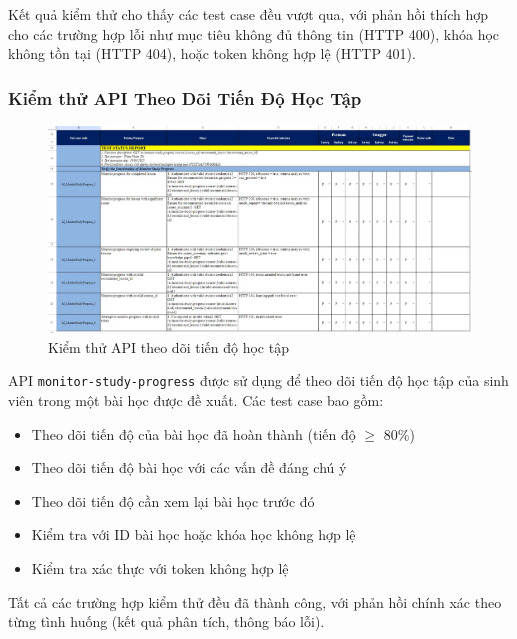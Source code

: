Kết quả kiểm thử cho thấy các test case đều vượt qua, với phản hồi thích hợp cho các trường hợp lỗi như mục tiêu không đủ thông tin (HTTP 400), khóa học không tồn tại (HTTP 404), hoặc token không hợp lệ (HTTP 401).

\subsubsection{Kiểm thử API Theo Dõi Tiến Độ Học Tập}
\begin{figure}[H]
	\centering
	\includegraphics[width=0.8\linewidth]{images/test/test_S1G14.png}
	\caption{Kiểm thử API theo dõi tiến độ học tập}
	\label{fig:testing_tracking_progress}
\end{figure}
API \texttt{monitor-study-progress} được sử dụng để theo dõi tiến độ học tập của sinh viên trong một bài học được đề xuất. Các test case bao gồm:
\begin{itemize}
    \item Theo dõi tiến độ của bài học đã hoàn thành (tiến độ $\geq$ 80\%)
    \item Theo dõi tiến độ bài học với các vấn đề đáng chú ý
    \item Theo dõi tiến độ cần xem lại bài học trước đó
    \item Kiểm tra với ID bài học hoặc khóa học không hợp lệ
    \item Kiểm tra xác thực với token không hợp lệ
\end{itemize}

Tất cả các trường hợp kiểm thử đều đã thành công, với phản hồi chính xác theo từng tình huống (kết quả phân tích, thông báo lỗi).

